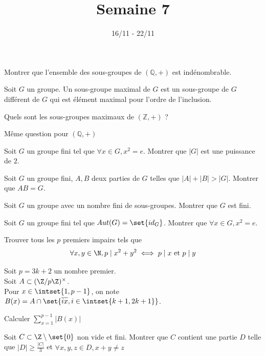 \documentclass[11pt,a4paper]{article}
\begin{document}
\title{Semaine 7}
\author{}
\date{16/11 - 22/11 }

\maketitle

\begin{exercise}
Montrer que l'ensemble des sous-groupes de $(\mathbb Q, +)$ est indénombrable.
\end{exercise}

\begin{exercise}
Soit $G$ un groupe. Un sous-groupe maximal de $G$ 
est un sous-groupe de $G$ différent de $G$ qui est élément maximal pour l'ordre de l'inclusion.
\begin{questions}
\item Quels sont les sous-groupes maximaux de $(\mathbb Z, +)$ ?
\item Même question pour $(\mathbb Q, +)$
\end{questions}
\end{exercise}

\begin{exercise}
Soit $G$ un groupe fini tel que $\forall x\in G, x^2=e$.
Montrer que $|G|$ est une puissance de $2$.
\end{exercise}

\begin{exercise}
Soit $G$ un groupe fini, $A,B$ deux parties de $G$
telles que $|A|+|B|>|G|$. Montrer que $AB=G$.
\end{exercise}

\begin{exercise}
Soit $G$ un groupe avec un nombre fini de sous-groupes.
Montrer que $G$ est fini.
\end{exercise}

\begin{exercise}
Soit $G$ un groupe fini tel que $Aut(G)=\set{id_G}$. Montrer que $\forall x\in G, x^2=e$.
\end{exercise}

\begin{exercise}
Trouver tous les $p$ premiers impairs tels que
$$\forall x,y\in\N,p\mid x^2+y^2\iff p\mid x \text{ et } p\mid y$$
\end{exercise}

\begin{exercise}
Soit $p=3k+2$ un nombre premier.\\
Soit $A\subset (\Z/p\Z)^{\times}$.\\
Pour $x\in\intset{1,p-1}$, on note $B(x)=A\cap\set{\overline{ix}, i\in\intset{k+1,2k+1}}$.
\begin{questions}
\item Calculer $\displaystyle\sum_{x=1}^{p-1} |B(x)|$
\item Soit $C\subset \Z\setminus\set{0}$ non vide et fini. 
Montrer que $C$ contient une partie $D$ telle que $|D|\geq\frac{|C|}{3}$ et
$\forall x,y,z\in D, x+y\neq z$
\end{questions}
\end{exercise}
\end{document}
